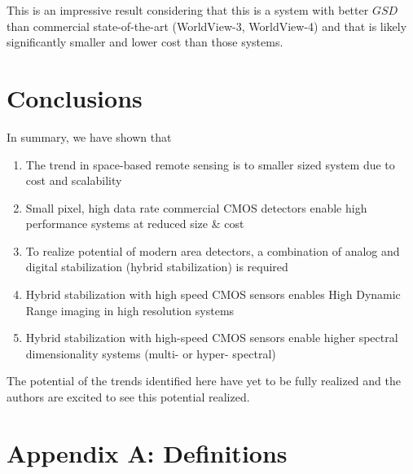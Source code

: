 \documentclass[10pt,journal]{IEEEtran}  %
\begin{document}
This is an impressive result considering that this is a system with better $GSD$ than commercial state-of-the-art (WorldView-3, WorldView-4) and that is likely significantly smaller and lower cost than those systems.

\section{Conclusions}
\label{sec:conclusions}

In summary, we have shown that

\begin{enumerate}
    \item The trend in space-based remote sensing is to smaller sized system due to cost and scalability
    \item Small pixel, high data rate commercial CMOS detectors enable high performance systems at reduced size \& cost
    \item To realize potential of modern area detectors, a combination of analog and digital stabilization (hybrid stabilization) is required
    \item Hybrid stabilization with high speed CMOS sensors enables High Dynamic Range imaging in high resolution systems
    \item Hybrid stabilization with high-speed CMOS sensors enable higher spectral dimensionality systems (multi- or hyper- spectral)
\end{enumerate}

The potential of the trends identified here have yet to be fully realized and the authors are excited to see this potential realized.

\section{Appendix A: Definitions}
\label{sec:appendix_a}

\end{document}
